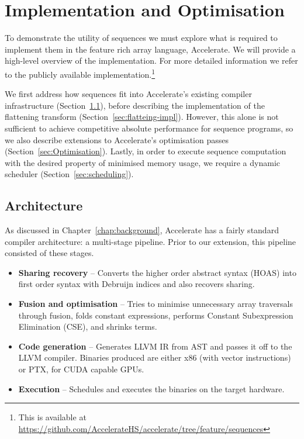 \chapter{Implementation and Optimisation}
\label{chap:implementation}

To demonstrate the utility of sequences we must explore what is required to implement them in the feature rich array language, Accelerate. We will provide a high-level overview of the implementation. For more detailed information we refer to the publicly available implementation.\footnote{This is available at \url{https://github.com/AccelerateHS/accelerate/tree/feature/sequences}}

We first address how sequences fit into Accelerate's existing compiler infrastructure (Section~\ref{sec:seq-architecture}), before describing the implementation of the flattening transform (Section~\ref{sec:flatteing-impl}). However, this alone is not sufficient to achieve competitive absolute performance for sequence programs, so we also describe extensions to Accelerate's optimisation passes (Section~\ref{sec:Optimisation}). Lastly, in order to execute sequence computation with the desired property of minimised memory usage, we require a dynamic scheduler (Section~\ref{sec:scheduling}).

\section{Architecture}
\label{sec:seq-architecture}
As discussed in Chapter~\ref{chap:background}, Accelerate has a fairly standard compiler architecture: a multi-stage pipeline. Prior to our extension, this pipeline consisted of these stages.

\begin{itemize}
%
\item \textbf{Sharing recovery} -- Converts the higher order abstract syntax (HOAS) into first order syntax with Debruijn indices and also recovers sharing.
%
%
\item \textbf{Fusion and optimisation} -- Tries to minimise unnecessary array traversals through fusion, folds constant expressions, performs Constant Subexpression Elimination (CSE), and shrinks terms.
%
\item \textbf{Code generation} -- Generates LLVM IR from AST and passes it off to the LLVM compiler. Binaries produced are either x86 (with vector instructions) or PTX, for CUDA capable GPUs.
%
\item \textbf{Execution} -- Schedules and executes the binaries on the target hardware.
\end{itemize}

